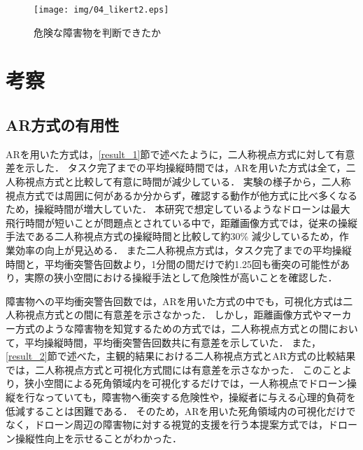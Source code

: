 \documentclass[submit, sigrecommended]{ipsj}
\begin{document}
\begin{figure}[tb]
\centering
\texttt{[image: img/04\_likert2.eps]}
\caption{危険な障害物を判断できたか}
\label{fig:04_likert2}
\end{figure}





\section{考察}
\subsection{AR方式の有用性}
ARを用いた方式は，\ref{result_1}節で述べたように，二人称視点方式に対して有意差を示した．
タスク完了までの平均操縦時間では，ARを用いた方式は全て，二人称視点方式と比較して有意に時間が減少している．
実験の様子から，二人称視点方式では周囲に何があるか分からず，確認する動作が他方式に比べ多くなるため，操縦時間が増大していた．
本研究で想定しているようなドローンは最大飛行時間が短いことが問題点とされている中で\cite{article-drone14}\cite{article-drone15}\cite{article-drone16}，距離画像方式では，従来の操縦手法である二人称視点方式の操縦時間と比較して約30\% 減少しているため，作業効率の向上が見込める．
また二人称視点方式は，タスク完了までの平均操縦時間と，平均衝突警告回数より，1分間の間だけで約1.25回も衝突の可能性があり，実際の狭小空間における操縦手法として危険性が高いことを確認した．
\par
障害物への平均衝突警告回数では，ARを用いた方式の中でも，可視化方式は二人称視点方式との間に有意差を示さなかった．
しかし，距離画像方式やマーカー方式のような障害物を知覚するための方式では，二人称視点方式との間において，平均操縦時間，平均衝突警告回数共に有意差を示していた．
また，\ref{result_2}節で述べた，主観的結果における二人称視点方式とAR方式の比較結果では，二人称視点方式と可視化方式間には有意差を示さなかった．
このことより，狭小空間による死角領域内を可視化するだけでは，一人称視点でドローン操縦を行なっていても，障害物へ衝突する危険性や，操縦者に与える心理的負荷を低減することは困難である．
そのため，ARを用いた死角領域内の可視化だけでなく，ドローン周辺の障害物に対する視覚的支援を行う本提案方式では，ドローン操縦性向上を示せることがわかった．
\end{document}
